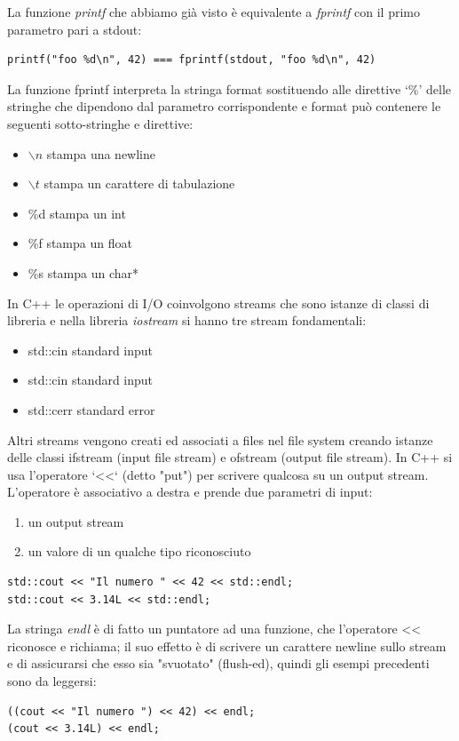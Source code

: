 \documentclass[a4paper,12pt, oneside]{book}
\begin{document}
	La funzione \textit{printf} che abbiamo già visto è equivalente a
	\textit{fprintf} con il primo parametro pari a stdout:
	\begin{verbatim}
printf("foo %d\n", 42) === fprintf(stdout, "foo %d\n", 42)
\end{verbatim}
	La funzione fprintf interpreta la stringa format sostituendo
	alle direttive ‘\%' delle stringhe che dipendono dal parametro
	corrispondente e format può contenere le seguenti sotto-stringhe e direttive:
	\begin{itemize}
		\item $\backslash n$ stampa una newline
		\item $\backslash t$ stampa un carattere di tabulazione
		\item \%d stampa un int
		\item \%f stampa un float
		\item \%s stampa un char*

	\end{itemize}
	In C++ le operazioni di I/O coinvolgono streams che sono
	istanze di classi di libreria e nella libreria \textit{iostream} si hanno tre stream fondamentali:
	\begin{itemize}
		\item std::cin standard input
		\item std::cin standard input
		\item std::cerr standard error
	\end{itemize}
	Altri streams vengono creati ed associati a files nel file system
	creando istanze delle classi ifstream (input file stream) e
	ofstream (output file stream). In C++ si usa l'operatore ‘<<‘ (detto "put") per scrivere qualcosa
	su un output stream. L'operatore è associativo a destra e prende due parametri di
	input:
	\begin{enumerate}
		\item un output stream
		\item un valore di un qualche tipo riconosciuto
	\end{enumerate}
	\begin{verbatim}
std::cout << "Il numero " << 42 << std::endl;
std::cout << 3.14L << std::endl;
\end{verbatim}
	La stringa \textit{endl }è di fatto un puntatore ad una funzione, che
	l'operatore << riconosce e richiama; il suo effetto è di scrivere
	un carattere newline sullo stream e di assicurarsi che esso sia
	"svuotato" (flush-ed), quindi gli esempi precedenti sono da leggersi:
	\begin{verbatim}
((cout << "Il numero ") << 42) << endl;
(cout << 3.14L) << endl;
\end{verbatim}
\end{document}
